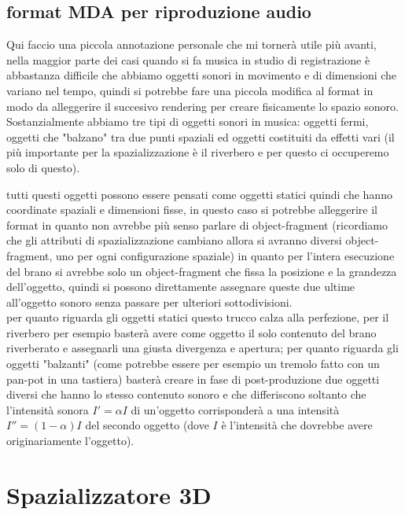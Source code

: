 \documentclass[12pt,a4paper]{report}
\begin{document}
\subsection{format MDA per riproduzione audio}

Qui faccio una piccola annotazione personale che mi tornerà utile più avanti, nella maggior parte dei casi quando si fa musica in studio di registrazione è abbastanza difficile che abbiamo oggetti sonori in movimento e di dimensioni che variano nel tempo, quindi si potrebbe fare una piccola modifica al format in modo da alleggerire il succesivo rendering per creare fisicamente lo spazio sonoro.\\

Sostanzialmente abbiamo tre tipi di oggetti sonori in musica: oggetti fermi, oggetti che "balzano" tra due punti spaziali ed oggetti costituiti da effetti vari (il più importante per la spazializzazione è il riverbero e per questo ci occuperemo solo di questo).

tutti questi oggetti possono essere pensati come oggetti statici quindi che hanno coordinate spaziali e dimensioni fisse, in questo caso si potrebbe alleggerire il format in quanto non avrebbe più senso parlare di object-fragment (ricordiamo che gli attributi di spazializzazione cambiano allora si avranno diversi object-fragment, uno per ogni configurazione spaziale) in quanto per l'intera esecuzione del brano si avrebbe solo un object-fragment che fissa la posizione e la grandezza dell'oggetto, quindi si possono direttamente assegnare queste due ultime all'oggetto sonoro senza passare per ulteriori sottodivisioni.\\

per quanto riguarda gli oggetti statici questo trucco calza alla perfezione, per il riverbero per esempio basterà avere come oggetto il solo contenuto del brano riverberato e assegnarli una giusta divergenza e apertura; per quanto riguarda gli oggetti "balzanti" (come potrebbe essere per esempio un tremolo fatto con un pan-pot in una tastiera) basterà creare in fase di post-produzione due oggetti diversi che hanno lo stesso contenuto sonoro e che differiscono soltanto che l'intensità sonora $I'=\alpha I$ di un'oggetto corrisponderà a una intensità $I''=(1-\alpha) I$ del secondo oggetto (dove $I$ è l'intensità che dovrebbe avere originariamente l'oggetto).

\section{Spazializzatore 3D}
\end{document}
